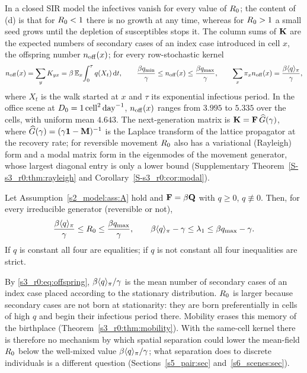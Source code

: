 In a closed SIR model the infectives vanish for every value of $R_0$; the content of (d) is that for $R_0<1$
there is no growth at any time, whereas for $R_0>1$ a small seed grows until the depletion of susceptibles
stops it. The column sums of $\mathbf{K}$ are the expected numbers of secondary cases of an index case introduced in
cell $x$, the offspring number $n_{\mathrm{off}}(x)$; for every row-stochastic kernel
\begin{equation}\label{s3_r0:eq:offspring}
  n_{\mathrm{off}}(x)=\sum_yK_{yx}=\beta\,\mathbb{E}_x\!\int_0^{\tau}q(X_t)\,\mathrm{d} t ,\qquad
  \frac{\beta q_{\min}}{\gamma}\le n_{\mathrm{off}}(x)\le\frac{\beta q_{\max}}{\gamma},\qquad \sum_x\pi_xn_{\mathrm{off}}(x)=\frac{\beta\langle q\rangle_{\pi}}{\gamma},
\end{equation}
where $X_t$ is the walk started at $x$ and $\tau$ its exponential infectious period. In the office scene at
$D_0=1\,\mathrm{cell}^2\,\mathrm{day}^{-1}$, $n_{\mathrm{off}}(x)$ ranges from $3.995$ to $5.335$ over the cells, with uniform mean $4.643$.
The next-generation matrix is $\mathbf{K}=\mathbf{F}\,\widehat G(\gamma)$, where $\widehat G(\gamma)=(\gamma\mathbf{1}-\mathbf{M})^{-1}$ is the Laplace transform of the
lattice propagator at the recovery rate; for reversible movement $R_0$ also has a variational (Rayleigh) form
and a modal matrix form in the eigenmodes of the movement generator, whose largest diagonal entry is only a lower
bound (Supplementary Theorem~\ref{S-s3_r0:thm:rayleigh} and Corollary~\ref{S-s3_r0:cor:modal}).

\begin{theorem}\label{s3_r0:thm:bounds}
  Let Assumption~\ref{s2_model:ass:A} hold and $\mathbf{F}=\beta\mathbf{Q}$ with $q\ge0$, $q\not\equiv0$.  Then, for every
  irreducible generator (reversible or not),
  \begin{equation}\label{s3_r0:eq:bounds}
    \frac{\beta\langle q\rangle_{\pi}}{\gamma}\le R_0\le\frac{\beta q_{\max}}{\gamma},\qquad
    \beta\langle q\rangle_{\pi}-\gamma\le\lambda_1\le\beta q_{\max}-\gamma .
  \end{equation}
  If $q$ is constant all four are equalities; if $q$ is not constant all four inequalities are strict.
\end{theorem}

By \eqref{s3_r0:eq:offspring}, $\beta\langle q\rangle_{\pi}/\gamma$ is the mean number of secondary cases of an index case
placed according to the stationary distribution. $R_0$ is larger because secondary cases are not born at
stationarity: they are born preferentially in cells of high $q$ and begin their infectious period there.
Mobility erases this memory of the birthplace (Theorem~\ref{s3_r0:thm:mobility}). With the same-cell kernel
there is therefore no mechanism by which spatial separation could lower the mean-field $R_0$ below the
well-mixed value $\beta\langle q\rangle_{\pi}/\gamma$; what separation does to discrete individuals is a different question
(Sections~\ref{s5_pair:sec} and~\ref{s6_scenes:sec}).

